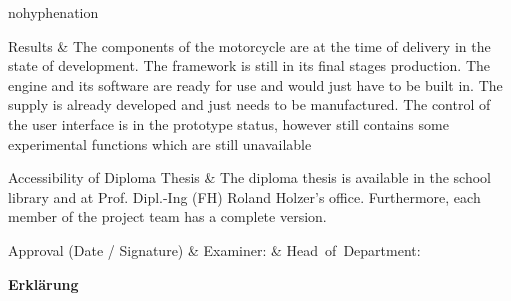{\begin{hyphenrules}{nohyphenation}
\begin{center}
			\begin{mytable}
				Results & The components of the motorcycle are at the time of delivery in the state of development. The framework is still in its final stages production. The engine and its software are ready for use and would just have to be built in. The supply is already developed and just needs to be manufactured. The control of the user interface is in the prototype status, however still contains some experimental functions which are still unavailable\\
			\end{mytable}\vskip-0.42cm
			\begin{mytable}
				Accessibility of Diploma Thesis & The diploma thesis is available in the school library and at Prof. Dipl.-Ing (FH) Roland Holzer’s office. Furthermore, each member of the project team has a complete version.
				\\
			\end{mytable}\vskip-0.42cm
			\begin{mytable}[{|X[0.995,c]|X[1,m]|X[1,m]|}]
				\hfil Approval \newline \hfil (Date / Signature) &
				\hbox{\footnotesize{Examiner:}} &
				\hbox{\footnotesize{Head of Department:}} \\
				\hline
			\end{mytable}
		\end{center}
	\end{hyphenrules}
}



\newpage
\thispagestyle{empty}
\mbox{}
\newpage


\newpage
\begin{huge}
\textbf{Erklärung}
\end{huge}
\bigskip



